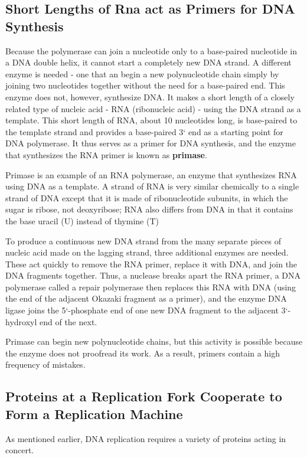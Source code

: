 \subsection{Short Lengths of Rna act as Primers for DNA Synthesis}

Because the polymerase can join a nucleotide
only to a base-paired nucleotide in a DNA double helix, it cannot start
a completely new DNA strand. A different enzyme is needed - one that
an begin a new polynucleotide chain simply by joining two nucleotides
together without the need for a base-paired end. This enzyme does not,
however, synthesize DNA. It makes a short length of a closely related type
of nucleic acid - RNA (ribonucleic acid) - using the DNA strand as a template.
This short length of RNA, about 10 nucleotides long, is base-paired
to the template strand and provides a base-paired 3` end as a starting
point for DNA polymerase. It thus serves as a primer for DNA synthesis,
and the enzyme that synthesizes the RNA primer is known as \textbf{primase}.

Primase is an example of an RNA polymerase, an enzyme that synthesizes
RNA using DNA as a template. A strand of RNA is very similar chemically
to a single strand of DNA except that it is made of ribonucleotide
subunits, in which the sugar is ribose, not deoxyribose; RNA also differs
from DNA in that it contains the base uracil (U) instead of thymine (T)

To produce a continuous new DNA strand from the many separate pieces
of nucleic acid made on the lagging strand, three additional enzymes are
needed. These act quickly to remove the RNA primer, replace it with DNA,
and join the DNA fragments together. Thus, a nuclease breaks apart the
RNA primer, a DNA polymerase called a repair polymerase then replaces
this RNA with DNA (using the end of the adjacent Okazaki fragment as
a primer), and the enzyme DNA ligase joins the 5`-phosphate end of one
new DNA fragment to the adjacent 3`-hydroxyl end of the next.

Primase can begin new polynucleotide chains, but this activity is possible
because the enzyme does not proofread its work. As a result, primers
contain a high frequency of mistakes.

\subsection{Proteins at a Replication Fork Cooperate to Form a Replication Machine}

As mentioned earlier, DNA replication requires a variety of proteins acting in concert.

